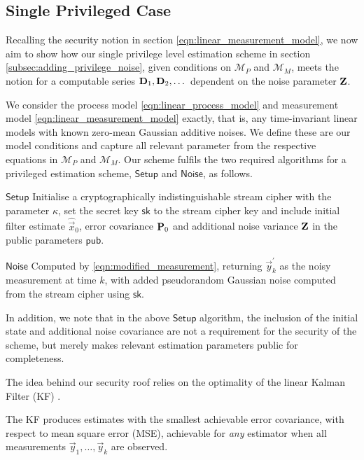 \documentclass[letterpaper, 10 pt, conference]{IEEEtran}
\theoremstyle{definition}
\theoremstyle{definition}
\theoremstyle{remark}
\begin{document}
\subsection{Single Privileged Case}
Recalling the security notion in section \eqref{eqn:linear_measurement_model}, we now aim to show how our single privilege level estimation scheme in section \ref{subsec:adding_privilege_noise}, given conditions on $\mathcal{M}_P$ and $\mathcal{M}_M$, meets the notion for a computable series ${{\mathbf{D}}}_1,{{\mathbf{D}}}_2,\dots$ dependent on the noise parameter ${{\mathbf{Z}}}$.

We consider the process model \eqref{eqn:linear_process_model} and measurement model \eqref{eqn:linear_measurement_model} exactly, that is, any time-invariant linear models with known zero-mean Gaussian additive noises. We define these are our model conditions and capture all relevant parameter from the respective equations in $\mathcal{M}_P$ and $\mathcal{M}_M$. Our scheme fulfils the two required algorithms for a privileged estimation scheme, $\mathsf{Setup}$ and $\mathsf{Noise}$, as follows.
\begin{LaTeXdescription}
   \item[$\mathsf{Setup}$] Initialise a cryptographically indistinguishable stream cipher with the parameter $\kappa$, set the secret key $\mathsf{sk}$ to the stream cipher key and include initial filter estimate $\hat{\vec{x}}_0$, error covariance ${{\mathbf{P}}}_0$ and additional noise variance ${{\mathbf{Z}}}$ in the public parameters $\mathsf{pub}$.
   \item[$\mathsf{Noise}$] Computed by \eqref{eqn:modified_measurement}, returning $\vec{y}^\prime_k$ as the noisy measurement at time $k$, with added pseudorandom Gaussian noise computed from the stream cipher using $\mathsf{sk}$.
\end{LaTeXdescription}
In addition, we note that in the above $\mathsf{Setup}$ algorithm, the inclusion of the initial state and additional noise covariance are not a requirement for the security of the scheme, but merely makes relevant estimation parameters public for completeness.


The idea behind our security roof relies on the optimality of the linear Kalman Filter (KF) \cite{kalmanNewApproachLinear1960}. 

The KF produces estimates with the smallest achievable error covariance, with respect to mean square error (MSE), achievable for \textit{any} estimator when all measurements $\vec{y}_1,\dots,\vec{y}_k$ are observed.
\end{document}
